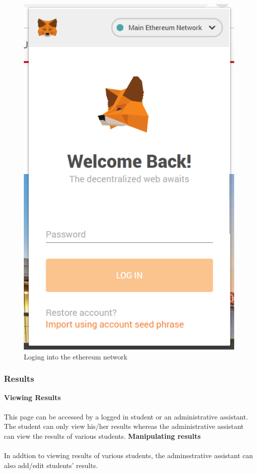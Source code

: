 \begin{figure}[!h]
\center
\includegraphics[scale=0.6]{images/metamasklogin.png}
\caption{Loging into the ethereum network}
\end{figure}

\subsubsection{Results}
\textbf{Viewing Results}\\~\\
This page can be accessed by a logged in student or an administrative assistant. The student can only view his/her results whereas the administrative assistant can view the results of various students.
\textbf{Manipulating results}\\~\\
In addtion to viewing results of various students, the adminsstrative assistant can also add/edit students’ results.
